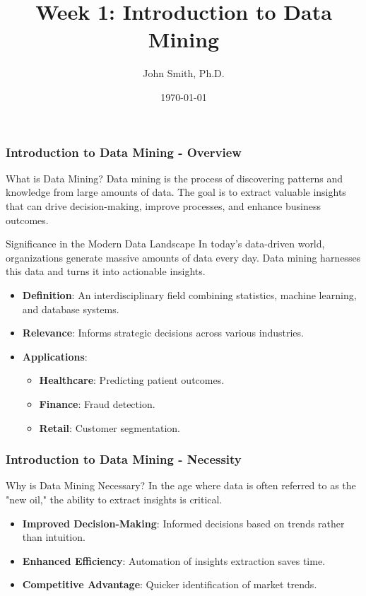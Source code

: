 \documentclass[aspectratio=169]{beamer}
\title[Week 1: Introduction to Data Mining]{Week 1: Introduction to Data Mining}
\author[J. Smith]{John Smith, Ph.D.}
\date{\today}
\begin{document}
\frame{\titlepage}

\begin{frame}[fragile]
    \frametitle{Introduction to Data Mining - Overview}
    \begin{block}{What is Data Mining?}
        Data mining is the process of discovering patterns and knowledge from large amounts of data. 
        The goal is to extract valuable insights that can drive decision-making, improve processes, and enhance business outcomes.
    \end{block}
    
    \begin{block}{Significance in the Modern Data Landscape}
        In today’s data-driven world, organizations generate massive amounts of data every day. 
        Data mining harnesses this data and turns it into actionable insights.
    \end{block}

    \begin{itemize}
        \item \textbf{Definition}: An interdisciplinary field combining statistics, machine learning, and database systems.
        \item \textbf{Relevance}: Informs strategic decisions across various industries.
        \item \textbf{Applications}:
            \begin{itemize}
                \item \textbf{Healthcare}: Predicting patient outcomes.
                \item \textbf{Finance}: Fraud detection.
                \item \textbf{Retail}: Customer segmentation.
            \end{itemize}
    \end{itemize}
\end{frame}

\begin{frame}[fragile]
    \frametitle{Introduction to Data Mining - Necessity}
    \begin{block}{Why is Data Mining Necessary?}
        In the age where data is often referred to as the "new oil," the ability to extract insights is critical. 
    \end{block}

    \begin{itemize}
        \item \textbf{Improved Decision-Making}: Informed decisions based on trends rather than intuition.
        \item \textbf{Enhanced Efficiency}: Automation of insights extraction saves time.
        \item \textbf{Competitive Advantage}: Quicker identification of market trends.
    \end{itemize}
\end{frame}
\end{document}
